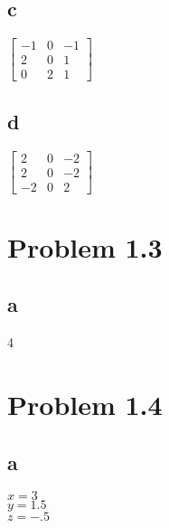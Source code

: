 \documentclass{article}
\begin{document}
\subsection*{c}
$
\begin{bmatrix}
 -1 & 0 & -1\\
  2 & 0 & 1\\
  0 & 2 & 1
\end{bmatrix}
$

\subsection*{d}
$
\begin{bmatrix}
  2 & 0 & -2\\
  2 & 0 & -2\\
  -2 & 0 & 2
\end{bmatrix}
$

\section*{Problem 1.3}
\subsection*{a}
4

\section*{Problem 1.4}
\subsection*{a}
$x=3$\\
$y=1.5$\\
$z=-.5$\\
\end{document}
